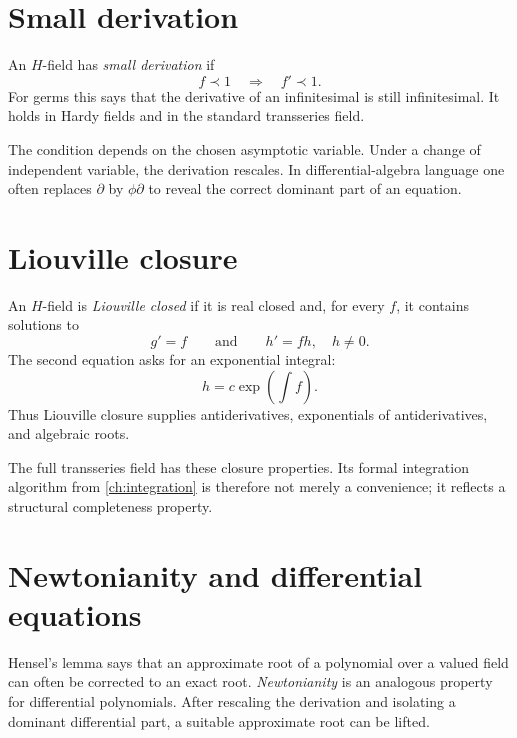 \documentclass[11pt,openany]{book}
\theoremstyle{definition}
\theoremstyle{plain}
\theoremstyle{remark}
\newcommand{\precdom}{\prec}
\begin{document}
\section{Small derivation}

An $H$-field has \emph{small derivation} if
\begin{equation}\label{eq:small-derivation}
 f\precdom1\quad\Longrightarrow\quad f'\precdom1.
\end{equation}
For germs this says that the derivative of an infinitesimal is still infinitesimal. It holds in Hardy fields and in the standard transseries field.

The condition depends on the chosen asymptotic variable. Under a change of independent variable, the derivation rescales. In differential-algebra language one often replaces $\partial$ by $\phi\partial$ to reveal the correct dominant part of an equation.

\section{Liouville closure}

An $H$-field is \emph{Liouville closed} if it is real closed and, for every $f$, it contains solutions to
\begin{equation}\label{eq:liouville-closure}
 g'=f
 \qquad\text{and}\qquad
 h'=fh,
 \quad h\ne0.
\end{equation}
The second equation asks for an exponential integral:
\[
 h=c\exp\left(\int f\right).
\]
Thus Liouville closure supplies antiderivatives, exponentials of antiderivatives, and algebraic roots.

The full transseries field has these closure properties. Its formal integration algorithm from \cref{ch:integration} is therefore not merely a convenience; it reflects a structural completeness property.

\section{Newtonianity and differential equations}

Hensel's lemma says that an approximate root of a polynomial over a valued field can often be corrected to an exact root. \emph{Newtonianity} is an analogous property for differential polynomials. After rescaling the derivation and isolating a dominant differential part, a suitable approximate root can be lifted.
\end{document}

